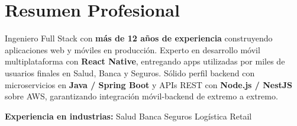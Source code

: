 
\section{Resumen Profesional}

Ingeniero Full Stack con \textbf{más de 12 años de experiencia} construyendo aplicaciones web y
móviles en producción. Experto en desarrollo móvil multiplataforma con \textbf{React Native},
entregando apps utilizadas por miles de usuarios finales en Salud, Banca y Seguros. Sólido perfil
backend con microservicios en \textbf{Java / Spring Boot} y APIs REST con \textbf{Node.js / NestJS}
sobre AWS, garantizando integración móvil-backend de extremo a extremo.

\vspace{4pt}
{\small\color{cvMuted}%
  \textbf{Experiencia en industrias:}\enspace%
  Salud\enspace\textbar\enspace
  Banca\enspace\textbar\enspace
  Seguros\enspace\textbar\enspace
  Logística\enspace\textbar\enspace
  Retail%
}
